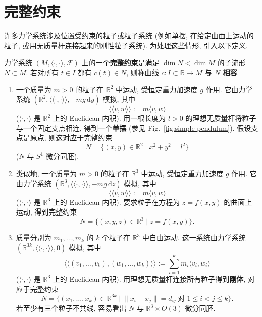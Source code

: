 \section{完整约束}\label{sec:holonomic-constraints}

许多力学系统涉及位置受约束的粒子或粒子系统 (例如单摆, 在给定曲面上运动的粒子, 或用无质量杆连接起来的刚性粒子系统). 为处理这些情形, 引入以下定义.

\begin{RiemannDefinition}\label{def:holonomic-constraint}
力学系统 $(M,\langle\cdot,\cdot\rangle,\mathcal{F})$ 上的一个\textbf{完整约束}是满足 $\dim N<\dim M$ 的子流形 $N\subset M$. 若对所有 $t\in I$ 都有 $c(t)\in N$, 则称曲线 $c:I\subset\mathbb{R}\to M$ \textbf{与 $N$ 相容}.
\end{RiemannDefinition}

\begin{RiemannExample}\label{ex:holonomic-constraints-of-pendulum-surface-rigid-body}
\begin{enumerate}[label=(\arabic*),ref=\arabic*,leftmargin=*]
\item\label{ex:simple-pendulum-constraint} 一个质量为 $m>0$ 的粒子在 $\mathbb{R}^2$ 中运动, 受恒定重力加速度 $g$ 作用. 它由力学系统 $(\mathbb{R}^2,\langle\!\langle\cdot,\cdot\rangle\!\rangle,-mg\,\mathrm{d}y)$ 模拟, 其中
\[
  \langle\!\langle v,w\rangle\!\rangle:=m\langle v,w\rangle
\]
($\langle\cdot,\cdot\rangle$ 是 $\mathbb{R}^2$ 上的 Euclidean 内积). 用一根长度为 $l>0$ 的理想无质量杆将粒子与一个固定支点相连, 得到一个\textbf{单摆} (参见 Fig.~\ref{fig:simple-pendulum}). 假设支点是原点, 则这对应于完整约束
\[
  N=\{(x,y)\in\mathbb{R}^2\mid x^2+y^2=l^2\}
\]
($N$ 与 $S^1$ 微分同胚).
\item\label{ex:particle-on-surface-constraint} 类似地, 一个质量为 $m>0$ 的粒子在 $\mathbb{R}^3$ 中运动, 受恒定重力加速度 $g$ 作用. 它由力学系统 $(\mathbb{R}^3,\langle\!\langle\cdot,\cdot\rangle\!\rangle,-mg\,\mathrm{d}z)$ 模拟, 其中
\[
  \langle\!\langle v,w\rangle\!\rangle:=m\langle v,w\rangle
\]
($\langle\cdot,\cdot\rangle$ 是 $\mathbb{R}^3$ 上的 Euclidean 内积). 要求粒子在方程为 $z=f(x,y)$ 的曲面上运动, 得到完整约束
\[
  N=\{(x,y,z)\in\mathbb{R}^3\mid z=f(x,y)\}.
\]
\item\label{ex:rigid-body-distance-constraints} 质量分别为 $m_1,\ldots,m_k$ 的 $k$ 个粒子在 $\mathbb{R}^3$ 中自由运动. 这一系统由力学系统 $(\mathbb{R}^{3k},\langle\!\langle\cdot,\cdot\rangle\!\rangle,0)$ 模拟, 其中
\[
  \langle\!\langle(v_1,\ldots,v_k),(w_1,\ldots,w_k)\rangle\!\rangle
  :=\sum_{i=1}^k m_i\langle v_i,w_i\rangle
\]
($\langle\cdot,\cdot\rangle$ 是 $\mathbb{R}^3$ 上的 Euclidean 内积). 用理想无质量杆连接所有粒子得到\textbf{刚体}, 对应于完整约束
\[
  N=\bigl\{(x_1,\ldots,x_k)\in\mathbb{R}^{3k}\mid
    \lVert x_i-x_j\rVert=d_{ij}\ \text{对 }1\leq i<j\leq k\bigr\}.
\]
若至少有三个粒子不共线, 容易看出 $N$ 与 $\mathbb{R}^3\times O(3)$ 微分同胚.
\end{enumerate}
\end{RiemannExample}

